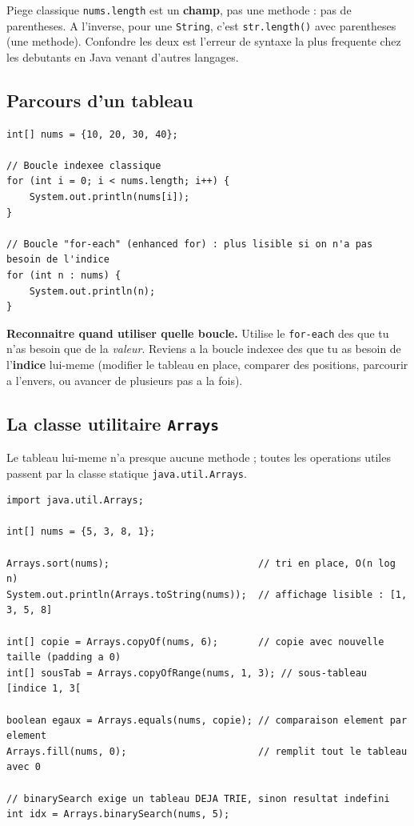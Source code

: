 \documentclass[11pt,a4paper]{article}
\begin{document}
\begin{infobox}{Piege classique}
\texttt{nums.length} est un \textbf{champ}, pas une methode : pas de parentheses.
A l'inverse, pour une \texttt{String}, c'est \texttt{str.length()} avec
parentheses (une methode). Confondre les deux est l'erreur de syntaxe la plus
frequente chez les debutants en Java venant d'autres langages.
\end{infobox}

\subsection{Parcours d'un tableau}

\begin{lstlisting}
int[] nums = {10, 20, 30, 40};

// Boucle indexee classique
for (int i = 0; i < nums.length; i++) {
    System.out.println(nums[i]);
}

// Boucle "for-each" (enhanced for) : plus lisible si on n'a pas besoin de l'indice
for (int n : nums) {
    System.out.println(n);
}
\end{lstlisting}

\textbf{Reconnaitre quand utiliser quelle boucle.} Utilise le \texttt{for-each}
des que tu n'as besoin que de la \emph{valeur}. Reviens a la boucle indexee des
que tu as besoin de l'\textbf{indice} lui-meme (modifier le tableau en place,
comparer des positions, parcourir a l'envers, ou avancer de plusieurs pas a la
fois).

\subsection{La classe utilitaire \texttt{Arrays}}

Le tableau lui-meme n'a presque aucune methode ; toutes les operations
utiles passent par la classe statique \texttt{java.util.Arrays}.

\begin{lstlisting}
import java.util.Arrays;

int[] nums = {5, 3, 8, 1};

Arrays.sort(nums);                          // tri en place, O(n log n)
System.out.println(Arrays.toString(nums));  // affichage lisible : [1, 3, 5, 8]

int[] copie = Arrays.copyOf(nums, 6);       // copie avec nouvelle taille (padding a 0)
int[] sousTab = Arrays.copyOfRange(nums, 1, 3); // sous-tableau [indice 1, 3[

boolean egaux = Arrays.equals(nums, copie); // comparaison element par element
Arrays.fill(nums, 0);                       // remplit tout le tableau avec 0

// binarySearch exige un tableau DEJA TRIE, sinon resultat indefini
int idx = Arrays.binarySearch(nums, 5);
\end{lstlisting}
\end{document}
